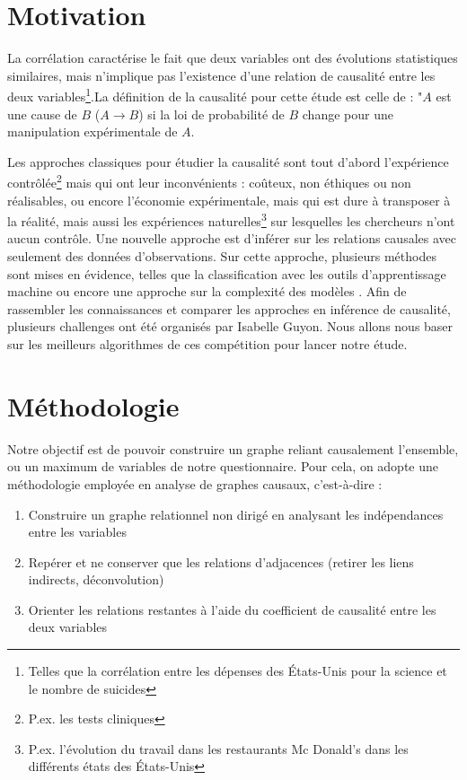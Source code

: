 \documentclass[11pt,fleqn,openany,frenchb]{book} %
\begin{document}
\section{Motivation}
La corrélation caractérise le fait que deux variables ont des évolutions statistiques similaires, mais n'implique pas l'existence d'une relation de causalité entre les deux variables\footnote{Telles que la corrélation entre les dépenses des \'Etats-Unis pour la  science et le nombre de suicides}.La définition de la causalité pour cette étude est celle de \cite{statnikov2012new} : "$A$ est une cause de $B$ ($A \rightarrow B$) si la loi de probabilité de $B$ change pour une manipulation expérimentale de $A$. \par
Les approches classiques pour étudier la causalité sont tout d'abord l'expérience contrôlée\footnote{P.ex. les tests cliniques} mais qui ont leur inconvénients : coûteux, non éthiques ou non réalisables, ou encore l'économie expérimentale, mais qui est dure à transposer à la réalité, mais aussi les expériences naturelles\footnote{P.ex. l'évolution du travail dans les restaurants Mc Donald's dans les différents états des \'Etats-Unis} sur lesquelles les chercheurs n'ont aucun contrôle. Une nouvelle approche est d'inférer sur les relations causales avec seulement des données d'observations. Sur cette approche, plusieurs méthodes sont mises en évidence, telles que la classification avec les outils d'apprentissage machine ou encore une approche sur la complexité des modèles \cite{stegle2010probabilistic}. Afin de rassembler les connaissances et comparer les approches en inférence de causalité, plusieurs challenges ont été organisés par Isabelle Guyon. Nous allons nous baser sur les meilleurs algorithmes de ces compétition pour lancer notre étude.   

\section{Méthodologie}
Notre objectif est de pouvoir construire un graphe reliant causalement l'ensemble, ou un maximum de variables de notre questionnaire. Pour cela, on adopte %
une méthodologie employée en analyse de graphes causaux, c'est-à-dire :

\begin{enumerate}
\item Construire un graphe relationnel non dirigé en analysant les indépendances entre les variables
\item Repérer et ne conserver que les relations d'adjacences (retirer les liens indirects, déconvolution)
\item Orienter les relations restantes à l'aide du coefficient de causalité entre les deux variables 
\end{enumerate}
\end{document}
